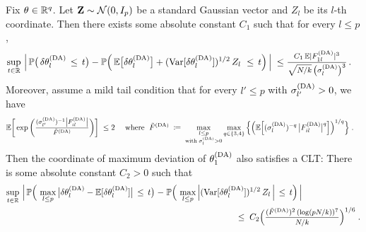 \begin{theorem} \label{thm:DA:CLT} Fix $\theta \in \mathbb{R}^q$. Let $\mathbf{Z} \sim \mathcal{N}(0,I_p)$ be a standard Gaussian vector and $Z_l$ be its $l$-th coordinate. Then there exists some absolute constant $C_1$ such that for every $l \leq p$,
\begin{align*}
    \sup_{t \in \R} 
    \,
    \Big|
    \,
        \P\big( \, 
         \delta \theta^{(\rm DA)}_l
        \,\leq\, t 
        \big)
        -
        \P\Big( \, \mean\big[ \delta \theta^{(\rm DA)}_l \big]  
        + (\Var[ \delta \theta^{(\rm DA)}_l  ])^{1/2} \, Z_l \, 
        \,\leq\, t 
        \Big)
    \,
    \Big|
    \;\leq&\;
    \mfrac{C_1 \, \mean | F^{(\rm DA)}_{1l} |^3}{ \sqrt{N / k} \, \big(\sigma^{(\rm DA)}_l\big)^3}
    \,.
\end{align*}   
Moreover, assume a mild tail condition that for every $ l' \leq p$ with $\sigma^{(\rm DA)}_{l'} > 0$, we have
\begin{align*}
    \mean\bigg[ \exp\bigg( \mfrac{ (\sigma^{(\rm DA)}_{ l'})^{-1} \big| F^{(\rm DA)}_{il} \big| }{
       \tilde F^{(\rm DA)}
    } \bigg) \bigg]     
    \;\leq&\; 2
    \quad 
    \text{ where }
    \;
    \tilde F^{(\rm DA)}
    \;\coloneqq\;
    \max_{\substack{l \leq p \\{\rm with }\; \sigma^{(\rm DA)}_l > 0}} \max_{q \in \{3, 4\}} \Big\{  
        \Big( \mean\Big[ (\sigma^{(\rm DA)}_{ l})^{-q}  \, \big|  F^{(\rm DA)}_{il} \big|^q \Big] \Big)^{1/q}
    \Big\}\;.
\end{align*}
Then the coordinate of maximum deviation of $\theta^{(\rm DA)}_1$ also satisfies a CLT: There is some absolute constant $C_2 > 0$ such that
\begin{align*}
    \sup_{t \in \R} 
    \,
    \Big|
    \,
        \P\Big( \, 
         \max_{l \leq p} \big| \delta \theta^{(\rm DA)}_l - \mean[\delta \theta^{(\rm DA)}_l] \big|
        \,\leq\, t 
        \big)
        \;-&\;
        \P\Big( \, 
        \max_{l \leq p} \Big|
        (\Var[ \delta \theta^{(\rm DA)}_l  ])^{1/2} \, Z_l \,
        \Big| 
        \,\leq\, t 
        \Big)
    \,
    \Big|
    \\
    &\hspace{8em} \;\leq\;
    C_2
    \Big( 
    \mfrac{  (\tilde F^{(\rm DA)})^2 \, (\log (p N /k) )^7}
    { N /k }  
    \Big)^{1/6}
    \;.
\end{align*}
\end{theorem}

